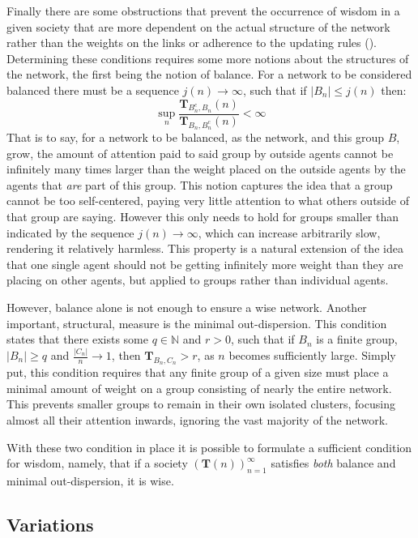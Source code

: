 \documentclass{article}
\newcommand{\T}{\textbf{T}}
\newcommand{\Soc}{(\T(n))^{\infty}_{n=1}}
\begin{document}
Finally there are some obstructions that prevent the occurrence of wisdom in a given society that are more dependent on the actual structure of the network rather than the weights on the links or adherence to the updating rules (\cite{jackson2010social}). Determining these conditions requires some more notions about the structures of the network, the first being the notion of balance. For a network to be considered balanced there must be a sequence $j(n) \to \infty$, such that if $|B_n| \leq j(n)$ then:
\begin{equation}
    \sup_n \frac{\T_{B^c_n, B_n}(n)}{\T_{B_n, B^c_n}(n)} < \infty
\end{equation}
That is to say, for a network to be balanced, as the network, and this group $B$, grow, the amount of attention paid to said group by outside agents cannot be infinitely many times larger than the weight placed on the outside agents by the agents that \emph{are} part of this group.
This notion captures the idea that a group cannot be too self-centered, paying very little attention to what others outside of that group are saying. However this only needs to hold for groups smaller than indicated by the sequence $j(n) \to\infty$, which can increase arbitrarily slow, rendering it relatively harmless.
This property is a natural extension of the idea that one single agent should not be getting infinitely more weight than they are placing on other agents, but applied to groups rather than individual agents. \newline

However, balance alone is not enough to ensure a wise network. Another important, structural, measure is the minimal out-dispersion. This condition states that there exists some $q\in \mathbb{N}$ and $r > 0$, such that if $B_n$ is a finite group, $|B_n|\geq q$ and $\frac{|C_n|}{n}\to 1$, then $\textbf{T}_{B_n, C_n} > r$, as $n$ becomes sufficiently large. Simply put, this condition requires that any finite group of a given size must place a minimal amount of weight on a group consisting of nearly the entire network. This prevents smaller groups to remain in their own isolated clusters, focusing almost all their attention inwards, ignoring the vast majority of the network.

With these two condition in place it is possible to formulate a sufficient condition for wisdom, namely, that if a society $\Soc$ satisfies \emph{both} balance and minimal out-dispersion, it is wise.

\subsection{Variations}
\end{document}
